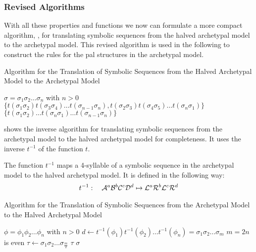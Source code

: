 \subsubsection{Revised Algorithms}

With all these properties and functions we now can formulate a more compact algorithm, , for translating symbolic sequences from the halved archetypal model to the archetypal model.
This revised algorithm is used in the following to construct the rules for the \gls{pal} structures in the archetypal model.

\begin{algorithm}
	\caption{Algorithm for the Translation of Symbolic Sequences from the Halved Archetypal Model to the Archetypal Model}
	\label{alg:halved.to.full}
	\begin{algorithmic}
		\Require $\sigma = \sigma_1\sigma_2 \dots \sigma_n$ with $n > 0$
		\State \Return $\{t(\sigma_1\sigma_2) t(\sigma_3\sigma_4) \dots t(\sigma_{n-1}\sigma_n), t(\sigma_2\sigma_3) t(\sigma_4\sigma_5) \dots t(\sigma_n\sigma_1)\}$
		\Else
		\State \Return $\{t(\sigma_1\sigma_2) \dots t(\sigma_{n}\sigma_1) \dots t(\sigma_{n-1}\sigma_n)\}$
		\EndIf
	\end{algorithmic}
\end{algorithm}

\clearpage

 shows the inverse algorithm for translating symbolic sequences from the archetypal model to the halved archetypal model for completeness.
It uses the inverse $t^{-1}$ of the function $t$.

\begin{definition}
	The function $t^{-1}$ maps a 4-syllable of a symbolic sequence in the archetypal model to the halved archetypal model.
	It is defined in the following way:
	\begin{align}
		t^{-1}: \quad \mathcal{A}^a\mathcal{B}^b\mathcal{C}^c\mathcal{D}^d \mapsto \mathcal{L}^a\mathcal{R}^b\mathcal{L}^c\mathcal{R}^d
	\end{align}
\end{definition}

\begin{algorithm}
	\caption{Algorithm for the Translation of Symbolic Sequences from the Archetypal Model to the Halved Archetypal Model}
	\label{alg:full.to.halved}
	\begin{algorithmic}
		\Require $\phi = \phi_1\phi_2 \dots \phi_n$ with $n > 0$
		\State $d \gets t^{-1}(\phi_1)t^{-1}(\phi_2) \dots t^{-1}(\phi_n) = \sigma_1\sigma_2 \dots \sigma_m$
		\Comment $m = 2n$ is even
		\State $\tau \gets \sigma_1\sigma_2 \dots \sigma_{\frac{m}{2}}$
		\If{$\sigma = \tau^2$}
		\State \Return $\tau$
		\Else
		\State \Return $\sigma$
		\EndIf
	\end{algorithmic}
\end{algorithm}
